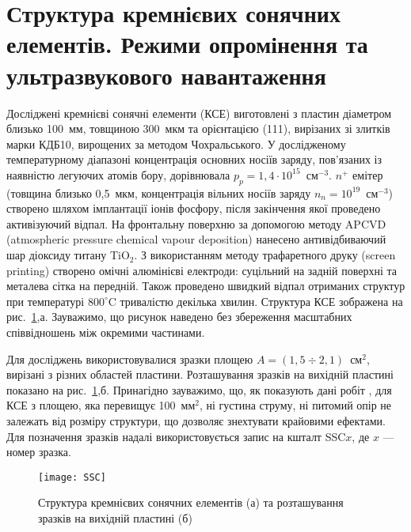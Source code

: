 \section{Структура кремнієвих сонячних елементів. Режими опромінення та ультразвукового навантаження\label{SSC}}
Досліджені кремнієві сонячні елементи (КСЕ) виготовлені з пластин діаметром близько 100~мм, товщиною 300~мкм та орієнтацією (111), вирізаних зі злитків марки КДБ10, вирощених за методом Чохральського.
У дослідженому температурному діапазоні концентрація основних носіїв заряду, пов'язаних із наявністю легуючих атомів бору, дорівнювала $p_p=1,4\cdot10^{15}$~см$^{-3}$.
$n^+$ емітер (товщина близько 0,5~мкм, концентрація вільних носіїв заряду $n_n=10^{19}$~см$^{-3}$) створено
шляхом імплантації іонів фосфору, після закінчення якої проведено активізуючий відпал.
На фронтальну поверхню за допомогою методу APCVD (atmospheric pressure chemical  vapour  deposition) нанесено антивідбиваючий шар діоксиду титану TiO$_2$.
З використанням методу трафаретного друку (screen printing) створено омічні алюмінієві електроди: суцільний на задній поверхні та металева сітка на передній.
Також проведено швидкий відпал отриманих структур при температурі $800^\circ$C тривалістю декілька хвилин.
Структура КСЕ зображена на рис.~\ref{figSSC},а.
Зауважимо, що рисунок наведено без збереження масштабних співвідношень між окремими частинами.




Для досліджень використовувалися зразки площею $A=(1,5\div2,1)$~см$^{2}$, вирізані з різних областей пластини.
Розташування зразків на вихідній пластині показано на рис.~\ref{figSSC},б.
Принагідно зауважимо, що, як показують дані робіт \cite{Breitenstein2013,SC:Area}, для КСЕ з площею, яка
перевищує 100~мм$^2$, ні густина струму, ні питомий опір не залежать від розміру структури, що
дозволяє знехтувати крайовими ефектами.
Для позначення зразків надалі використовується запис на кшталт SSC$x$, де $x$ --- номер зразка.


\begin{figure}
\center
\texttt{[image: SSC]}%
\caption{\label{figSSC}
Структура кремнієвих сонячних елементів (а) та розташування зразків на вихідній пластині (б)
}
\end{figure}


